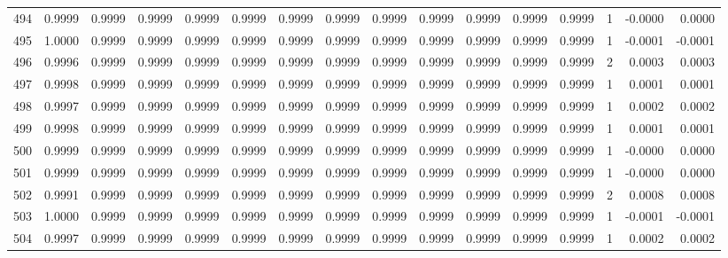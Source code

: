 \begin{tabular}{lrrrrrrrrrrrrrrr}
494 &      0.9999 &  0.9999 &  0.9999 &  0.9999 &  0.9999 &  0.9999 &  0.9999 &  0.9999 &  0.9999 &  0.9999 &   0.9999 &     0.9999 &      1 &                   -0.0000 &                     0.0000 \\
495 &      1.0000 &  0.9999 &  0.9999 &  0.9999 &  0.9999 &  0.9999 &  0.9999 &  0.9999 &  0.9999 &  0.9999 &   0.9999 &     0.9999 &      1 &                   -0.0001 &                    -0.0001 \\
496 &      0.9996 &  0.9999 &  0.9999 &  0.9999 &  0.9999 &  0.9999 &  0.9999 &  0.9999 &  0.9999 &  0.9999 &   0.9999 &     0.9999 &      2 &                    0.0003 &                     0.0003 \\
497 &      0.9998 &  0.9999 &  0.9999 &  0.9999 &  0.9999 &  0.9999 &  0.9999 &  0.9999 &  0.9999 &  0.9999 &   0.9999 &     0.9999 &      1 &                    0.0001 &                     0.0001 \\
498 &      0.9997 &  0.9999 &  0.9999 &  0.9999 &  0.9999 &  0.9999 &  0.9999 &  0.9999 &  0.9999 &  0.9999 &   0.9999 &     0.9999 &      1 &                    0.0002 &                     0.0002 \\
499 &      0.9998 &  0.9999 &  0.9999 &  0.9999 &  0.9999 &  0.9999 &  0.9999 &  0.9999 &  0.9999 &  0.9999 &   0.9999 &     0.9999 &      1 &                    0.0001 &                     0.0001 \\
500 &      0.9999 &  0.9999 &  0.9999 &  0.9999 &  0.9999 &  0.9999 &  0.9999 &  0.9999 &  0.9999 &  0.9999 &   0.9999 &     0.9999 &      1 &                   -0.0000 &                     0.0000 \\
501 &      0.9999 &  0.9999 &  0.9999 &  0.9999 &  0.9999 &  0.9999 &  0.9999 &  0.9999 &  0.9999 &  0.9999 &   0.9999 &     0.9999 &      1 &                   -0.0000 &                     0.0000 \\
502 &      0.9991 &  0.9999 &  0.9999 &  0.9999 &  0.9999 &  0.9999 &  0.9999 &  0.9999 &  0.9999 &  0.9999 &   0.9999 &     0.9999 &      2 &                    0.0008 &                     0.0008 \\
503 &      1.0000 &  0.9999 &  0.9999 &  0.9999 &  0.9999 &  0.9999 &  0.9999 &  0.9999 &  0.9999 &  0.9999 &   0.9999 &     0.9999 &      1 &                   -0.0001 &                    -0.0001 \\
504 &      0.9997 &  0.9999 &  0.9999 &  0.9999 &  0.9999 &  0.9999 &  0.9999 &  0.9999 &  0.9999 &  0.9999 &   0.9999 &     0.9999 &      1 &                    0.0002 &                     0.0002 \\

\end{tabular}
